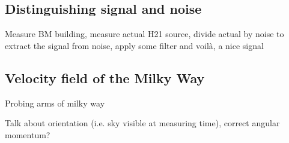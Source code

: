 \subsection{Distinguishing signal and noise}
Measure BM building, measure actual H21 source, divide actual by noise to extract the signal from noise, apply some filter and voilà, a nice signal

\subsection{Velocity field of the Milky Way}
Probing arms of milky way

Talk about orientation (i.e. sky visible at measuring time), correct angular momentum?
